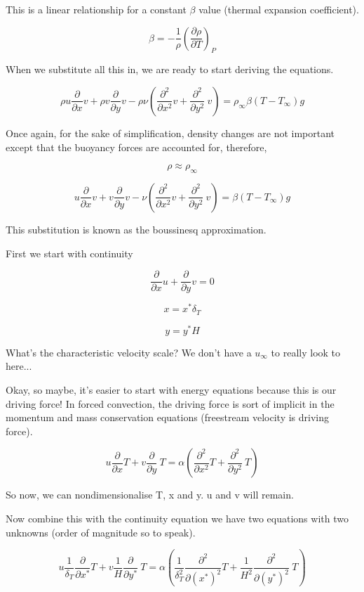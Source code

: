 \documentclass[11pt]{article}
\begin{document}
This is a linear relationship for a constant $\beta$ value (thermal expansion coefficient).

$$ \beta  = - \frac{1}{\rho} \left( \frac{\partial \rho}{\partial T} \right)_P$$

When we substitute all this in, we are ready to start deriving the equations.

$$\rho u \frac{\partial}{\partial x} v + \rho v \frac{\partial}{\partial y} v  -\rho \nu ( \frac{\partial^2}{\partial x^2} v + \frac{\partial^2}{\partial y^2} \ v ) = \rho_\infty \beta(T-T_\infty)  g$$

Once again, for the sake of simplification, density changes are not important except that the buoyancy forces are accounted for, therefore,

$$\rho \approx \rho_\infty$$

$$ u \frac{\partial}{\partial x} v +  v \frac{\partial}{\partial y} v  - \nu ( \frac{\partial^2}{\partial x^2} v + \frac{\partial^2}{\partial y^2} \ v ) =  \beta(T-T_\infty)  g$$


This substitution is known as the boussinesq approximation.

First we start with continuity

$$  \frac{\partial}{\partial x} u +  \frac{\partial}{\partial y} v  = 0$$

$$ x = x^* \delta_T$$

$$y=y^* H$$

What's the characteristic velocity scale? We don't have a $u_\infty$ to really look to here...

Okay, so maybe, it's easier to start with energy equations because this is our driving force! In forced convection, the driving force is sort of implicit in the momentum and mass conservation equations (freestream velocity is driving force). 

$$ u \frac{\partial}{\partial x} T + v \frac{\partial }{\partial y} \ T  = \alpha ( \frac{\partial^2}{\partial x^2} T +  \frac{\partial^2 }{\partial y^2} \ T) $$ 

So now, we can nondimensionalise T, x and y. u and v will remain. 

Now combine this with the continuity equation we have two equations with two unknowns (order of magnitude so to speak).

$$ u \frac{1}{\delta_T} \frac{\partial}{\partial x^*} T + v \frac{1}{H} \frac{\partial }{\partial y^*} \ T  = \alpha ( \frac{1}{\delta_T^2} \frac{\partial^2}{\partial (x^*)^2} T + \frac{1}{H^2} \frac{\partial^2 }{\partial (y^*)^2} \ T) $$ 
\end{document}
